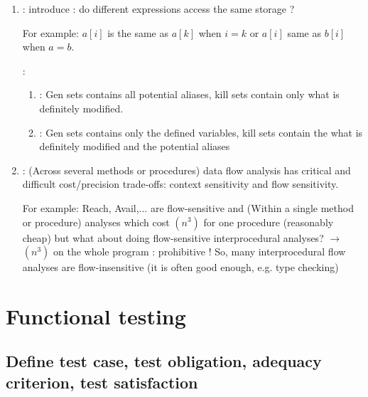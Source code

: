 \begin{enumerate}
    \item {} : introduce  : do different expressions access the same storage ?
    
    For example: $a[i]$ is the same as $a[k]$ when $i=k$ or $a[i]$ same as $b[i]$ when $a=b$. 
    
    : 
    \begin{enumerate}
        \item {} : Gen sets contains all potential aliases, kill sets contain only what is definitely modified.
        \item {} : Gen sets contains only the defined variables, kill sets contain the what is definitely modified and the potential aliases
    \end{enumerate}
    \item {} :  (Across several methods or procedures) data flow analysis has critical and difficult cost/precision trade-offs: context sensitivity and flow sensitivity.
    
    For example: Reach, Avail,... are flow-sensitive and  (Within a single method or procedure) analyses which cost \bigO$(n^3)$ for one procedure (reasonably cheap) but what about doing flow-sensitive interprocedural analyses? $\rightarrow$ \bigO$(n^3)$ on the whole program : prohibitive ! So, many interprocedural flow analyses are flow-insensitive (it is often good enough, e.g. type checking)
\end{enumerate}

\chapter{Functional testing}

\section{Define test case, test obligation, adequacy criterion, test satisfaction}

